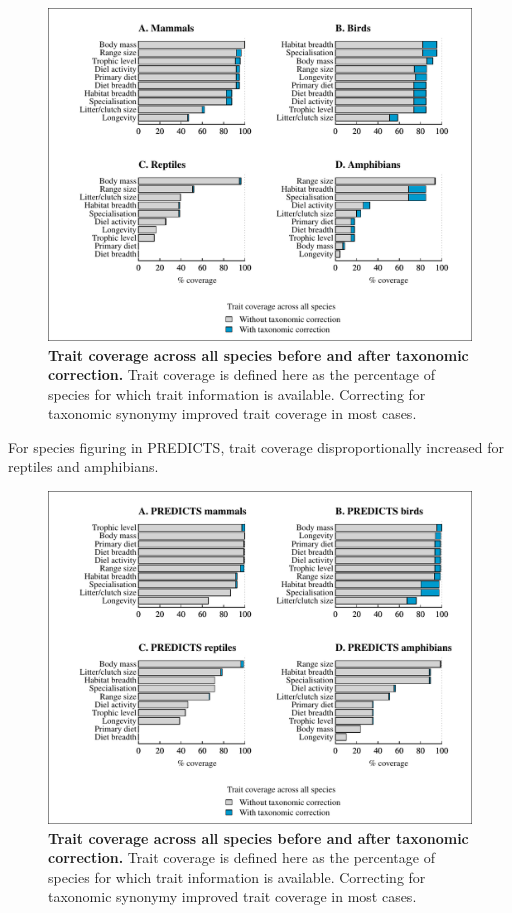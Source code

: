 \begin{figure}[h!]
\centering
\includegraphics[scale=0.85]{figures/chapter2/Target_traits_All_species_coverage}
\caption[Trait coverage across all species before and after taxonomic correction]{\textbf{Trait coverage across all species before and after taxonomic correction.} Trait coverage is defined here as the percentage of species for which trait information is available. Correcting for taxonomic synonymy improved trait coverage in most cases.}
\end{figure}

For species figuring in PREDICTS, trait coverage disproportionally increased for reptiles and amphibians.

\begin{figure}[h!]
\centering
\includegraphics[scale=0.85]{figures/chapter2/Target_traits_Predicts_species_coverage}
\caption[Trait coverage across PREDICTS species before and after taxonomic correction]{\textbf{Trait coverage across all species before and after taxonomic correction.} Trait coverage is defined here as the percentage of species for which trait information is available. Correcting for taxonomic synonymy improved trait coverage in most cases.}
\end{figure}



